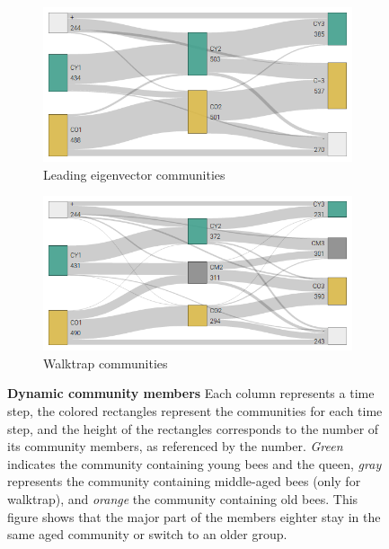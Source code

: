 \begin{figure}[htb]
	\centering
	\begin{subfigure}[b]{1.0\textwidth}
	\centering
	\includegraphics[width=.8\textwidth]{Figures/le_matching}
	\caption[Leading eigenvector communities]{Leading eigenvector communities}
	\label{fig:membersLE}
	\vspace*{5mm}
	\end{subfigure} 
	\begin{subfigure}[b]{1.0\textwidth}
	\centering
	\includegraphics[width=.8\textwidth]{Figures/wt_matching}
	\caption[Walktrap communities]{Walktrap communities}
	\label{fig:membersWT}
	\vspace*{5mm}
	\end{subfigure}
	\caption[Dynamic community members]{\textbf{Dynamic community members} 
	Each column represents a time step, the colored rectangles represent the communities for each time step, and the height of the rectangles corresponds to the number of its community members, as referenced by the number. \emph{Green} indicates the community containing young bees and the queen, \emph{gray} represents the community containing middle-aged bees (only for walktrap), and \emph{orange} the community containing old bees. This figure shows that the major part of the members eighter stay in the same aged community or switch to an older group.}
	\label{fig:members}
\end{figure}
